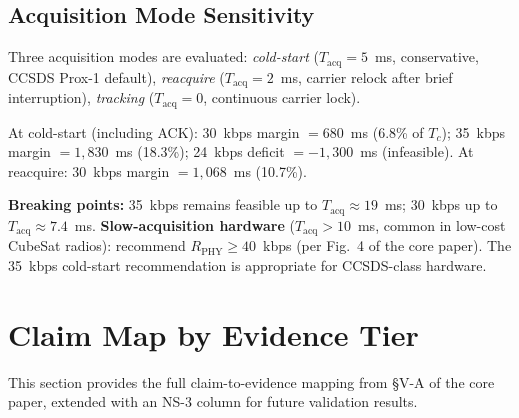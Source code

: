 \documentclass[journal]{IEEEtran}
\begin{document}
\subsection{Acquisition Mode Sensitivity}

Three acquisition modes are evaluated: \emph{cold-start} ($T_{\text{acq}}\!=\!5$~ms, conservative, CCSDS Prox-1 default), \emph{reacquire} ($T_{\text{acq}}\!=\!2$~ms, carrier relock after brief interruption), \emph{tracking} ($T_{\text{acq}}\!=\!0$, continuous carrier lock).

At cold-start (including ACK): 30~kbps margin $= 680$~ms (6.8\% of $T_c$); 35~kbps margin $= 1{,}830$~ms (18.3\%); 24~kbps deficit $= -1{,}300$~ms (infeasible). At reacquire: 30~kbps margin $= 1{,}068$~ms (10.7\%).

\textbf{Breaking points:} 35~kbps remains feasible up to $T_{\text{acq}} \approx 19$~ms; 30~kbps up to $T_{\text{acq}} \approx 7.4$~ms. \textbf{Slow-acquisition hardware} ($T_{\text{acq}} > 10$~ms, common in low-cost CubeSat radios): recommend $R_{\text{PHY}} \geq 40$~kbps (per Fig.~4 of the core paper). The 35~kbps cold-start recommendation is appropriate for CCSDS-class hardware.


\section{Claim Map by Evidence Tier}
\label{sec:supp-claim-map}

This section provides the full claim-to-evidence mapping from \S V-A of the core paper, extended with an NS-3 column for future validation results.
\end{document}
